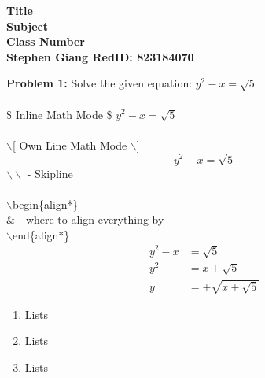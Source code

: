 \documentclass[11pt]{article}							%
\newcommand{\skipline}{\vspace{\baselineskip}}			%
\newenvironment{problem}[1]{\textbf{Problem #1: }}{}	%
\begin{document}
	
	\begin{center}
		\textbf{Title} \\
		\textbf{Subject} \\
		\textbf{Class Number} \\
		\textbf{Stephen Giang RedID: 823184070} \\
		\skipline \skipline
	\end{center}

	\begin{problem}{1}
		Solve the given equation: $y^2 - x = \sqrt{5}$
		\\ \\
		\$ Inline Math Mode \$ \qquad $y^2 - x = \sqrt{5}$
		\\ \\
		$\backslash$[ Own Line Math Mode $\backslash$] 
		\[y^2 - x = \sqrt{5}\]
		$\backslash \backslash$ - Skipline
		\\ \\
		$\backslash$begin\{align*\} \\
			\& - where to align everything by \\
		$\backslash$end\{align*\}
		\begin{align*}
			y^2 - x &= \sqrt{5} \\
			y^2 &= x + \sqrt{5} \\
			y &= \pm \sqrt{x + \sqrt{5}}
		\end{align*}
		\begin{enumerate}[label = (\alph*)]
			\item Lists
			\item Lists
			\item Lists
		\end{enumerate}
	\end{problem}
\end{document}
